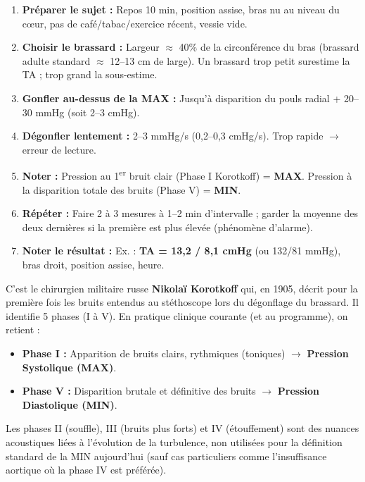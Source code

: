 \documentclass[11pt]{article}
\begin{document}
\begin{methode}
\begin{enumerate}
    \item \textbf{Préparer le sujet :} Repos 10 min, position assise, bras nu au niveau du cœur, pas de café/tabac/exercice récent, vessie vide.
    \item \textbf{Choisir le brassard :} Largeur $\approx$ 40\% de la circonférence du bras (brassard adulte standard $\approx$ 12--13 cm de large). Un brassard trop petit surestime la TA ; trop grand la sous-estime.
    \item \textbf{Gonfler au-dessus de la MAX :} Jusqu'à disparition du pouls radial + 20--30 mmHg (soit 2--3 cmHg).
    \item \textbf{Dégonfler lentement :} 2--3 mmHg/s (0,2--0,3 cmHg/s). Trop rapide $\rightarrow$ erreur de lecture.
    \item \textbf{Noter :} Pression au 1\textsuperscript{er} bruit clair (Phase I Korotkoff) = \textbf{MAX}. Pression à la disparition totale des bruits (Phase V) = \textbf{MIN}.
    \item \textbf{Répéter :} Faire 2 à 3 mesures à 1--2 min d'intervalle ; garder la moyenne des deux dernières si la première est plus élevée (phénomène d'alarme).
    \item \textbf{Noter le résultat :} Ex. : \textbf{TA = 13,2 / 8,1 cmHg} (ou 132/81 mmHg), bras droit, position assise, heure.
\end{enumerate}
\end{methode}

\begin{savaistu}
C'est le chirurgien militaire russe \textbf{Nikolaï Korotkoff} qui, en 1905, décrit pour la première fois les bruits entendus au stéthoscope lors du dégonflage du brassard. Il identifie 5 phases (I à V). En pratique clinique courante (et au programme), on retient :
\begin{itemize}
    \item \textbf{Phase I :} Apparition de bruits clairs, rythmiques (toniques) $\rightarrow$ \textbf{Pression Systolique (MAX)}.
    \item \textbf{Phase V :} Disparition brutale et définitive des bruits $\rightarrow$ \textbf{Pression Diastolique (MIN)}.
\end{itemize}
Les phases II (souffle), III (bruits plus forts) et IV (étouffement) sont des nuances acoustiques liées à l'évolution de la turbulence, non utilisées pour la définition standard de la MIN aujourd'hui (sauf cas particuliers comme l'insuffisance aortique où la phase IV est préférée).
\end{savaistu}
\end{document}
